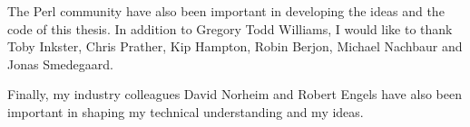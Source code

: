 The Perl community have also been important in developing the ideas
and the code of this thesis. In addition to Gregory Todd Williams, I
would like to thank Toby Inkster, Chris Prather, Kip Hampton, Robin
Berjon, Michael Nachbaur and Jonas Smedegaard.

Finally, my industry colleagues David Norheim and Robert Engels have
also been important in shaping my technical understanding and my
ideas.
